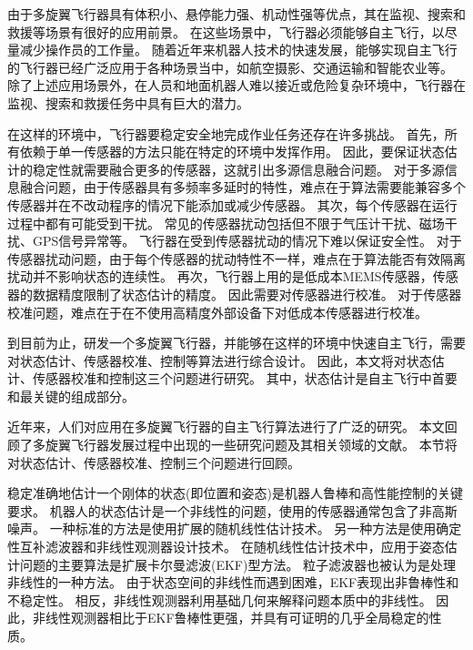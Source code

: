 \documentclass[
  type=master
]{gdutthesis}
\begin{document}

\gduttableofcontents

\mainmatter


由于多旋翼飞行器具有体积小、悬停能力强、机动性强等优点，其在监视、搜索和救援等场景有很好的应用前景。
在这些场景中，飞行器必须能够自主飞行，以尽量减少操作员的工作量。
随着近年来机器人技术的快速发展，能够实现自主飞行的飞行器已经广泛应用于各种场景当中，如航空摄影、交通运输和智能农业等。
除了上述应用场景外，在人员和地面机器人难以接近或危险复杂环境中，飞行器在监视、搜索和救援任务中具有巨大的潜力。

在这样的环境中，飞行器要稳定安全地完成作业任务还存在许多挑战。
首先，所有依赖于单一传感器的方法只能在特定的环境中发挥作用。
因此，要保证状态估计的稳定性就需要融合更多的传感器，这就引出多源信息融合问题。
对于多源信息融合问题，由于传感器具有多频率多延时的特性，难点在于算法需要能兼容多个传感器并在不改动程序的情况下能添加或减少传感器。
其次，每个传感器在运行过程中都有可能受到干扰。
常见的传感器扰动包括但不限于气压计干扰、磁场干扰、GPS信号异常等。
飞行器在受到传感器扰动的情况下难以保证安全性。
对于传感器扰动问题，由于每个传感器的扰动特性不一样，难点在于算法能否有效隔离扰动并不影响状态的连续性。
再次，飞行器上用的是低成本MEMS传感器，传感器的数据精度限制了状态估计的精度。
因此需要对传感器进行校准。
对于传感器校准问题，难点在于在不使用高精度外部设备下对低成本传感器进行校准。

到目前为止，研发一个多旋翼飞行器，并能够在这样的环境中快速自主飞行，需要对状态估计、传感器校准、控制等算法进行综合设计。
因此，本文将对状态估计、传感器校准和控制这三个问题进行研究。
其中，状态估计是自主飞行中首要和最关键的组成部分。

近年来，人们对应用在多旋翼飞行器的自主飞行算法进行了广泛的研究。
本文回顾了多旋翼飞行器发展过程中出现的一些研究问题及其相关领域的文献。
本节将对状态估计、传感器校准、控制三个问题进行回顾。

稳定准确地估计一个刚体的状态(即位置和姿态)是机器人鲁棒和高性能控制的关键要求。
机器人的状态估计是一个非线性的问题，使用的传感器通常包含了非高斯噪声\cite{baldwin2009inertial}。
一种标准的方法是使用扩展的随机线性估计技术\cite{lefferts1982kalman,barshan1995inertial}。
另一种方法是使用确定性互补滤波器和非线性观测器设计技术\cite{zimmermann1992high,baerveldt1997low,vik2001nonlinear}。
在随机线性估计技术中，应用于姿态估计问题的主要算法是扩展卡尔曼滤波(EKF)型方法。
粒子滤波器也被认为是处理非线性的一种方法\cite{cheng2004particle}。
由于状态空间的非线性而遇到困难，EKF表现出非鲁棒性和不稳定性\cite{crassidis2007survey}。
相反，非线性观测器利用基础几何来解释问题本质中的非线性。
因此，非线性观测器相比于EKF鲁棒性更强，并具有可证明的几乎全局稳定的性质\cite{thienel2003coupled,mahony2008nonlinear,lageman2009gradient,hua2010attitude,vasconcelos2010nonlinear}。
\end{document}
